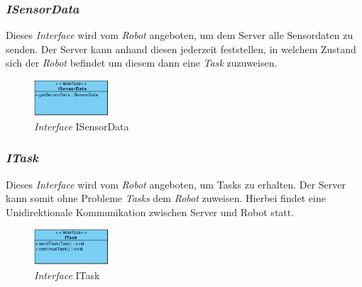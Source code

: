 	\subsubsection{\textit{ISensorData}}
	Dieses \textit{Interface} wird vom \textit{Robot} angeboten, um dem Server alle Sensordaten zu senden. Der Server kann anhand diesen jederzeit feststellen, in welchem Zustand sich der \textit{Robot} befindet um diesem dann eine \textit{Task} zuzuweisen.
	\begin{figure}[H]
	\centering
	\includegraphics[width=0.25\textwidth]{img/1-Entwurf-3-1_ISensorData}
	\caption{\textit{Interface} ISensorData}
	\label{ISensorData}
	\end{figure}
	
	\subsubsection{\textit{ITask}}
	Dieses \textit{Interface} wird vom \textit{Robot} angeboten, um Tasks zu erhalten. Der Server kann somit ohne Probleme \textit{Tasks} dem \textit{Robot} zuweisen. Hierbei findet eine Unidirektionale Kommunikation zwischen Server und Robot statt.
	\begin{figure}[H]
	\centering
	\includegraphics[width=0.25\textwidth]{img/1-Entwurf-3-1_ITask}
	\caption{\textit{Interface} ITask}
	\label{ITask}
	\end{figure}
